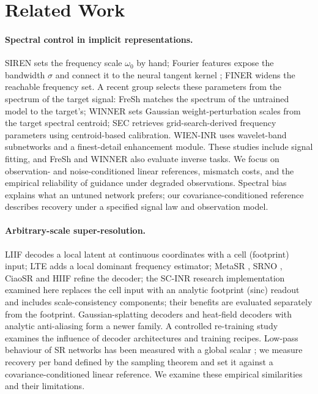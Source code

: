 \section{Related Work}\label{sec:related}

\paragraph{Spectral control in implicit representations.}
SIREN \citep{sitzmann2020siren} sets the frequency scale $\omega_0$ by hand;
Fourier features \citep{tancik2020fourier} expose the bandwidth $\sigma$ and
connect it to the neural tangent kernel \citep{jacot2018ntk}; FINER
\citep{liu2024finer} widens the reachable frequency set. A recent group
selects these parameters from the spectrum of the target signal: FreSh
\citep{kania2025fresh} matches the spectrum of the untrained model to the
target's; WINNER \citep{winner2025} sets Gaussian weight-perturbation scales
from the target spectral centroid; SEC \citep{sec2026} retrieves
grid-search-derived frequency parameters using centroid-based calibration.
WIEN-INR \citep{wieninr} uses wavelet-band subnetworks and a finest-detail
enhancement module. These studies include signal fitting, and FreSh and
WINNER also evaluate inverse tasks. We focus on observation- and
noise-conditioned linear references, mismatch costs, and the empirical
reliability of guidance under degraded observations. Spectral bias
\citep{rahaman2019spectral} explains what an untuned network prefers; our covariance-conditioned reference describes recovery under a specified signal law and observation model.

\paragraph{Arbitrary-scale super-resolution.}
LIIF \citep{chen2021liif} decodes a local latent at continuous coordinates
with a cell (footprint) input; LTE \citep{lee2022lte} adds a local dominant
frequency estimator; MetaSR \citep{hu2019metasr}, SRNO \citep{wei2023srno},
CiaoSR \citep{cao2023ciaosr} and HIIF \citep{jiang2025hiif} refine the
decoder; the SC-INR research implementation examined here replaces the cell input with an
analytic footprint (sinc) readout and includes scale-consistency components; their benefits are evaluated separately from the footprint. Gaussian-splatting decoders
\citep{chen2025gsasr} and heat-field decoders with analytic anti-aliasing
\citep{becker2025thera} form a newer family. A controlled re-training study
\citep{nasir2026empirical} examines the influence of decoder architectures and training recipes. Low-pass behaviour of SR networks has been measured with a global
scalar \citep{fsds2024}; we measure recovery per band defined by the sampling
theorem and set it against a covariance-conditioned linear reference. We examine these empirical similarities and their limitations.

